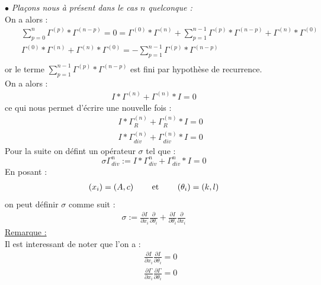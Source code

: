 \documentclass[a4paper,11pt]{article} %
\theoremstyle{plain}
\theoremstyle{definition}
\theoremstyle{remark}
\numberwithin{equation}{section}
\numberwithin{equation}{subsection}
\numberwithin{figure}{section}
\begin{document}
\noindent
$\bullet$ \textit{Plaçons nous à présent dans le cas $n$ quelconque :}  \\
On a alors :
\begin{eqnarray*}
 &&\sum_{p=0}^{n} \Gamma^{(p)} * \Gamma^{(n-p)} = 0 = \Gamma^{(0)} * \Gamma^{(n)} + \sum_{p=1}^{n-1} \Gamma^{(p)} * \Gamma^{(n-p)} 
+ \Gamma^{(n)} * \Gamma^{(0)}\\
 &&\Gamma^{(0)} * \Gamma^{(n)} + \Gamma^{(n)} * \Gamma^{(0)} = -\sum_{p=1}^{n-1} \Gamma^{(p)} * \Gamma^{(n-p)} \\
\end{eqnarray*}
or le terme $ \sum_{p=1}^{n-1} \Gamma^{(p)} * \Gamma^{(n-p)}$ est fini par hypothèse de recurrence.\\
On a alors : 
\begin{eqnarray*}
 I * \Gamma^{(n)} + \Gamma^{(n)} * I = 0
\end{eqnarray*}
ce qui nous permet d'écrire une nouvelle fois :
\begin{eqnarray*}
  && I * \Gamma^{(n)}_{R} + \Gamma^{(n)}_{R} * I = 0   \\
  && I * \Gamma^{(n)}_{div} + \Gamma^{(n)}_{div} * I = 0
\end{eqnarray*}
Pour la suite on défint un opérateur $\sigma$ tel que :
\begin{equation*}
 \sigma \Gamma^{n}_{div} := I * \Gamma^{n}_{div} + \Gamma^{n}_{div} * I = 0
\end{equation*}
En posant :
\begin{eqnarray*}
 \left(x_{i}\right) = \left(A,c\right) \text{ \hspace{5mm} et \hspace{5mm} }  \left(\theta_{i}\right) = \left(k,l\right)
\end{eqnarray*}
on peut définir $\sigma$ comme suit :
\begin{eqnarray*}
 \sigma := \frac{\partial I}{\partial x_{i}} \frac{\partial}{\partial \theta_{i}} + 
\frac{\partial I}{\partial \theta_{i}} \frac{\partial}{\partial x_{i}}
\end{eqnarray*}
\underline{Remarque :}\\
Il est interessant de noter que l'on a :
\begin{eqnarray*}
 && \frac{\partial I}{\partial x_{i}} \frac{\partial I}{\partial \theta_{i}} = 0 \\
 && \frac{\partial \Gamma}{\partial x_{i}} \frac{\partial \Gamma}{\partial \theta_{i}} = 0
\end{eqnarray*}
\end{document}
